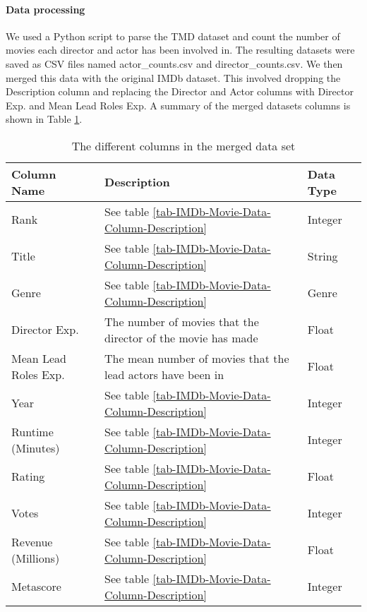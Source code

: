     \paragraph{Data processing}
        We used a Python script to parse the TMD dataset and count the number of
            movies each director and actor has been involved in.
        The resulting datasets were saved as CSV files named actor\_counts.csv and
            director\_counts.csv.
        We then merged this data with the original IMDb
            dataset.
        This involved dropping the Description column and replacing the
            Director and Actor columns with Director Exp. and Mean Lead Roles Exp.
        A summary of the merged datasets columns is shown in Table
            \ref*{tab-merged-data-column-description}.

        \begin{table}[h]
            \begin{tabular}{lp{9cm}l}
                \toprule
                Column Name          & Description                                                  & Data Type \\
                \midrule
                Rank                 & See table \ref{tab-IMDb-Movie-Data-Column-Description}       & Integer   \\
                Title                & See table \ref{tab-IMDb-Movie-Data-Column-Description}       & String    \\
                Genre                & See table \ref{tab-IMDb-Movie-Data-Column-Description}       & Genre     \\
                Director Exp.        & The number of movies that the director of the movie has made & Float     \\
                Mean Lead Roles Exp. & The mean number of movies that the lead actors have been in  & Float     \\
                Year                 & See table \ref{tab-IMDb-Movie-Data-Column-Description}       & Integer   \\
                Runtime (Minutes)    & See table \ref{tab-IMDb-Movie-Data-Column-Description}       & Integer   \\
                Rating               & See table \ref{tab-IMDb-Movie-Data-Column-Description}       & Float     \\
                Votes                & See table \ref{tab-IMDb-Movie-Data-Column-Description}       & Integer   \\
                Revenue (Millions)   & See table \ref{tab-IMDb-Movie-Data-Column-Description}       & Float     \\
                Metascore            & See table \ref{tab-IMDb-Movie-Data-Column-Description}       & Integer   \\
                \bottomrule
            \end{tabular}
            \caption[short]{The different columns in the merged data set}\label{tab-merged-data-column-description}
        \end{table}

